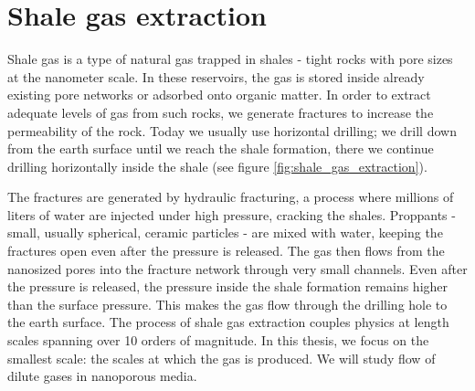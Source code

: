 \section{Shale gas extraction}
\label{sec:shale_gas_extraction}
Shale gas is a type of natural gas trapped in shales - tight rocks with pore sizes at the nanometer scale. In these reservoirs, the gas is stored inside already existing pore networks or adsorbed onto organic matter. In order to extract adequate levels of gas from such rocks, we generate fractures to increase the permeability of the rock. Today we usually use horizontal drilling; we drill down from the earth surface until we reach the shale formation, there we continue drilling horizontally inside the shale (see figure \ref{fig:shale_gas_extraction}).

The fractures are generated by hydraulic fracturing, a process where millions of liters of water are injected under high pressure, cracking the shales. Proppants - small, usually spherical, ceramic particles - are mixed with water, keeping the fractures open even after the pressure is released. The gas then flows from the nanosized pores into the fracture network through very small channels. Even after the pressure is released, the pressure inside the shale formation remains higher than the surface pressure. This makes the gas flow through the drilling hole to the earth surface. The process of shale gas extraction couples physics at length scales spanning over 10 orders of magnitude. In this thesis, we focus on the smallest scale: the scales at  
which the gas is produced. We will study flow of dilute gases in nanoporous media.

